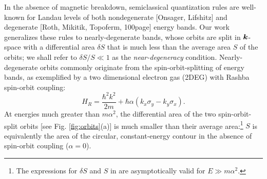 \documentclass[aps, prb, showpacs, twocolumn, notitlepage, superscriptaddress]{revtex4-1}
\begin{document}


In the absence of magnetic breakdown, semiclassical quantization rules are well-known for Landau levels of  both nondegenerate [Onsager, Lifshitz] and degenerate [Roth, Mikitik, Topoferm, 100page] energy bands. Our work generalizes these rules to nearly-degenerate bands, whose orbits are split in $\boldsymbol{k}$-space with a differential area  $\delta S$ that is much less than the average area $S$ of the orbits; we shall refer to $\delta S/S{\ll}1$ as the \textit{near-degeneracy} condition. Nearly-degenerate orbits commonly originate from the spin-orbit-splitting of energy bands, as exemplified by a two dimensional electron gas (2DEG) with Rashba spin-orbit coupling:
\begin{equation}
H_R=\frac{{\hbar^2} k^2}{2m}+\hbar\alpha  (k_{x}\sigma_{y}-k_{y}\sigma_{x}).\label{eq:Rashba-Hamiltonian}
\end{equation}
At energies much greater than $m\alpha^2$, the differential area of the two spin-orbit-split orbits [see Fig. \ref{fig:orbits}(a)] is much smaller than their average area:\footnote{The expressions for $\delta S$ and $S$ in  are asymptotically valid for $E{\gg}m\alpha^2$.}
$S$ is equivalently the area of the circular, constant-energy contour in the absence of spin-orbit coupling ($\alpha{=}0$).
\end{document}
